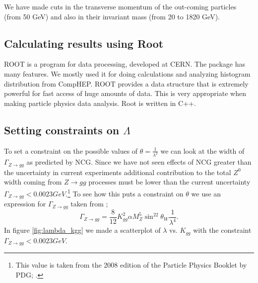 We have made cuts in the transverse momentum of the out-coming particles (from 50 GeV) and also in their invariant mass (from 20 to 1820 GeV). 

\subsection{Calculating results using Root}
ROOT is a program for data processing, developed at CERN. The package has many features. We mostly used it for doing calculations and analyzing histogram distribution from CompHEP. ROOT provides a data structure that is extremely powerful for fast access of huge amounts of data. This is very appropriate when making particle physics data analysis. Root is written in C++.

\subsection{Setting constraints on $\Lambda$}
To set a constraint on the possible values of $\theta = \frac{1}{\lambda^2}$ we can look at the width of $\Gamma_{Z \rightarrow gg}$ as predicted by NCG. Since we have not seen effects of NCG greater than the uncertainty in current experiments additional contribution to the total $Z^0$ width coming from $Z \rightarrow gg$ processes must be lower than the current uncertainty $\Gamma_{Z \rightarrow gg} < 0.0023 GeV$.\footnote{This value is taken from the 2008 edition of the Particle Physics Booklet by PDG; \cite{amsler2008rpp}.} To see how this puts a constraint on $\theta$ we use an expression for $\Gamma_{Z \rightarrow gg}$ taken from \cite{behr2003dnc};
\begin{equation}
	\Gamma_{Z \rightarrow gg} = \frac{8}{12} K_{gg}^2 \alpha M_Z^5 \sin^22\theta_W \frac{1}{\lambda^4}.
\end{equation}
In figure \ref{fig:lambda_kgg} we made a scatterplot of $\lambda$ vs. $K_{gg}$ with the constraint $\Gamma_{Z \rightarrow gg} < 0.0023 GeV$.
